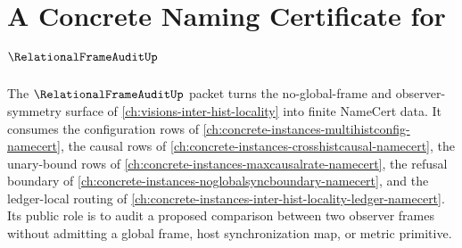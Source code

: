 \chapter{A Concrete Naming Certificate for $\RelationalFrameAuditUp$}
\label{ch:concrete-instances-relationalframeaudit-namecert}

The $\RelationalFrameAuditUp$ packet turns the no-global-frame and observer-symmetry surface of \autoref{ch:visions-inter-hist-locality} into finite NameCert data. It consumes the configuration rows of \autoref{ch:concrete-instances-multihistconfig-namecert}, the causal rows of \autoref{ch:concrete-instances-crosshistcausal-namecert}, the unary-bound rows of \autoref{ch:concrete-instances-maxcausalrate-namecert}, the refusal boundary of \autoref{ch:concrete-instances-noglobalsyncboundary-namecert}, and the ledger-local routing of \autoref{ch:concrete-instances-inter-hist-locality-ledger-namecert}. Its public role is to audit a proposed comparison between two observer frames without admitting a global frame, host synchronization map, or metric primitive.

